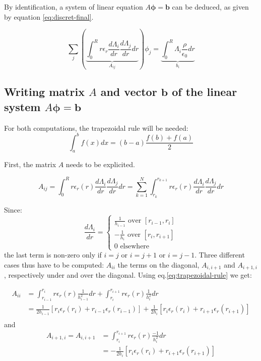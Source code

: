 \documentclass[a4paper,12pt,twoside]{article}
\newcommand{\mbf}[1]{\mathbf{#1}} %
\newcommand{\bracket}[1]{\left(#1\right)}
\begin{document}
  By identification, a system of linear equation $A\mbf{\phi}=\mbf{b}$ can be deduced, as given by equation \eqref{eq:discret-final}.

  \begin{equation}
    \sum_j\bracket{\underbrace{\int_0^R r\epsilon_r\frac{d\Lambda_i}{dr}\frac{d\Lambda_j}{dr}dr}_{A_{ij}}}\phi_j = \underbrace{\int_0^R \Lambda_i\frac{\rho}{\epsilon_0}dr}_{b_i}
    \label{eq:discret-final}
  \end{equation}



  \subsection{Writing matrix $A$ and vector $\mbf{b}$ of the linear system $A\mbf{\phi}=\mbf{b}$}\label{sec:writing-A-b1} %
  
  For both computations, the trapezoidal rule will be needed:
  \begin{equation}
    \int_a^b f\bracket{x}dx = \bracket{b-a}\frac{f\bracket{b} + f\bracket{a}}{2}
    \label{eq:trapezoidal-rule}
  \end{equation}

  First, the matrix $A$ needs to be explicited.
  
  \begin{equation*}
   A_{ij} = \int_0^R r\epsilon_r(r)\frac{d\Lambda_i}{dr}\frac{d\Lambda_j}{dr}dr = \sum_{k=1}^N \int_{r_{k}}^{r_{k+1}}r \epsilon_r(r)\frac{d\Lambda_i}{dr}\frac{d\Lambda_j}{dr}dr
  \end{equation*}
  
  Since:
  \begin{equation}
   \frac{d\Lambda_i}{dr}= \begin{cases}
   \frac{1}{h_{i-1}} \text{ over } [r_{i-1},r_i]\\
   -\frac{1}{h_{i}} \text{ over } [r_i,r_{i+1}]\\
   0 \text{ elsewhere}
                          \end{cases}
    \label{eq:lambderiv}
  \end{equation}the last term is non-zero only if $i=j$ or $i=j+1$ or $i=j-1$. Three different cases thus have to be computed: $A_{ii}$ the terms on the diagonal, $A_{i,i+1}$ and $A_{i+1,i}$, respectively under and over the diagonal. Using eq.\eqref{eq:trapezoidal-rule} we get:
  
  \begin{align*}
   A_{ii} &= \int_{r_{i-1}}^{r_i} r\epsilon_r(r) \frac{1}{h_{i-1}^2} dr + \int_{r_i}^{r_{i+1}} r\epsilon_r(r) \frac{1}{h_i^2} dr\\
   &= \frac{1}{2 h_{i-1}} [r_i \epsilon_r(r_i)+r_{i-1}\epsilon_r(r_{i-1})] + \frac{1}{2 h_i} [r_i \epsilon_r(r_i)+r_{i+1}\epsilon_r(r_{i+1})]\\   
  \end{align*}
  and
  \begin{align*}
   A_{i+1,i} = A_{i,i+1} &= \int_{r_i}^{r_{i+1}} r\epsilon_r(r) \frac{-1}{h_i^2} dr\\
   &= -\frac{1}{2 h_i} [r_i \epsilon_r(r_i)+r_{i+1}\epsilon_r(r_{i+1})]\\
  \end{align*}
\end{document}
